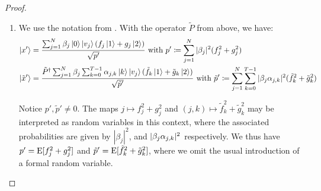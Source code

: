 \begin{proof}
\begin{enumerate}[label=(\roman*), wide]
\begin{enumerate}[label=(\arabic*)]
            \item \label{hhl_evol_time_calc_2} In the right term, use the fact, that the \(\djk\) values differ by an integer multiple of \(2\pi\) each to upper bound the summation term by the series \(\sum_{k=1}^\infty \frac{1}{4\pi^2k^2}\). After obtaining the bound, which is only dependent on \(\kappa^2/t_0^2\), we use \(\sum_{j=1}^N |\beta_j|^2 = 1\).
            
            \item \label{hhl_evol_time_calc_3} We use . A consequence of this calculation is \(\sum_{j=1}^N |\beta_j|^2 \sum_{k=0}^{T-1} |\ajk|^2 \djk^2 < 106\).
        \end{enumerate}

        Since \(\ket{b}\) was chosen arbitrarily and \(\sqrt{261} < 17\), this concludes the proof.

        \item \label{evol_time_theorem_2} We use the notation from . With the operator \(\tilde{P}\) from above, we have:
        \begin{align}
            \ket{x'} &= \frac{\sum_{j=1}^N \beta_j \ket{0}\ket{v_j}(f_j\ket{1}+g_j\ket{2})}{\sqrt{p'}} \text{ with } p' \coloneqq \sum_{j=1}^N |\beta_j|^2 (f_j^2+g_j^2)\\
            \ket{\tilde{x}'} &= \frac{\tilde{P}^\dagger \sum_{j=1}^N \beta_j \sum_{k=0}^{T-1} \alpha_{j, k} \ket{k}\ket{v_j}(\tilde{f}_k\ket{1}+\tilde{g}_k\ket{2})}{\sqrt{\tilde{p}'}} \text{ with } \tilde{p}' \coloneqq \sum_{j=1}^N \sum_{k=0}^{T-1} |\beta_j \alpha_{j, k}|^2 (\tilde{f}_k^2+\tilde{g}_k^2)
        \end{align}
        
        Notice \(p', \tilde{p}' \neq 0\). The maps \(j \mapsto f_j^2 + g_j^2\) and \((j, k) \mapsto \tilde{f}_k^2 + \tilde{g}_k^2\) may be interpreted as random variables in this context, where the associated probabilities are given by \(|\beta_j|^2\), and \(|\beta_j\alpha_{j, k}|^2\) respectively. We thus have \(p' = \operatorname{E}[f_j^2+g_j^2]\) and \(\tilde{p}' = \operatorname{E}[\tilde{f}_k^2 + \tilde{g}_k^2]\), where we omit the usual introduction of a formal random variable.


\end{enumerate}
\end{proof}
